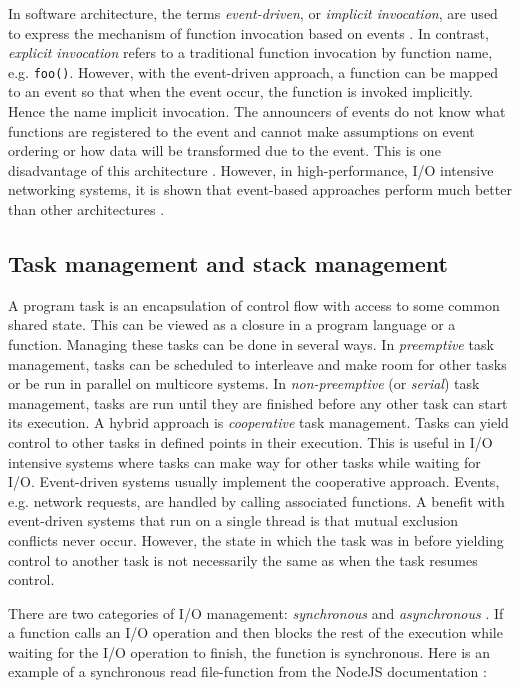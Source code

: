 In software architecture, the terms \textit{event-driven}, or \textit{implicit
invocation}, are used to express the mechanism of function invocation based on
events \cite{garlan1993introduction}. In contrast, \textit{explicit invocation}
refers to a traditional function invocation by function name, e.g.
\lstinline{foo()}. However, with the event-driven approach, a function can be
mapped to an event so that when the event occur, the function is invoked
implicitly. Hence the name implicit invocation. The announcers of events do not
know what functions are registered to the event and cannot make assumptions on
event ordering or how data will be transformed due to the event. This is one
disadvantage of this architecture \cite{garlan1993introduction}. However, in
high-performance, I/O intensive networking systems, it is shown that
event-based approaches perform much better than other architectures
\cite{hu1997measuring}.

\subsection{Task management and stack management}
\label{sec:task-management}

A program task is an encapsulation of control flow with access to some common
shared state. This can be viewed as a closure in a program language or a
function. Managing these tasks can be done in several ways. In
\textit{preemptive} task management, tasks can be scheduled to interleave and
make room for other tasks or be run in parallel on multicore systems. In
\textit{non-preemptive} (or \textit{serial}) task management, tasks are run
until they are finished before any other task can start its execution. A hybrid
approach is \textit{cooperative} task management. Tasks can yield control to
other tasks in defined points in their execution. This is useful in I/O
intensive systems where tasks can make way for other tasks while waiting for
I/O. Event-driven systems usually implement the cooperative approach. Events,
e.g. network requests, are handled by calling associated functions. A benefit
with event-driven systems that run on a single thread is that mutual exclusion
conflicts never occur. However, the state in which the task was in before
yielding control to another task is not necessarily the same as when the task
resumes control. \cite{adya2002cooperative}

There are two categories of I/O management: \textit{synchronous} and
\textit{asynchronous} \cite{adya2002cooperative}. If a function calls an I/O
operation and then blocks the rest of the execution while waiting for the I/O
operation to finish, the function is synchronous. Here is an example of a
synchronous read file-function from the NodeJS documentation
\cite{nodejs-docs}:

